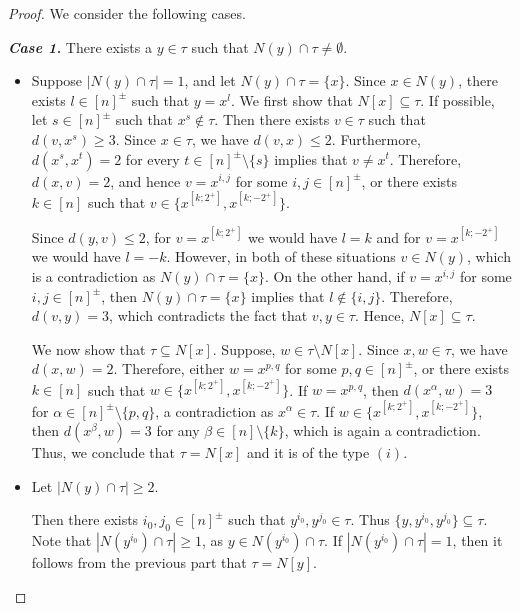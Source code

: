\documentclass{amsart}
\theoremstyle{definition}
\theoremstyle{remark}
\numberwithin{equation}{section}
\begin{document}
\begin{proof}
	We consider the following cases. 
	
	{\it \bf Case 1.} There exists a $y \in \tau$ such that $N(y) \cap \tau \neq  \emptyset$. 
	
	\begin{itemize}
		\item Suppose $|N(y) \cap \tau|=1$, and let $N(y) \cap \tau = \{x\}$. Since $x \in N(y)$, there exists  $l\in [n]^{\pm}$ such that 
		$y = x^{l}$.  We first show that  $N[x] \subseteq \tau$. If possible, let $s \in [n]^{\pm}$ such that $x^{s} \notin \tau$. Then %
        there exists  $v\in\tau$ such that $d(v, x^{s}) \geq 3$. Since $x \in \tau$, we have $d(v, x) \leq 2$. Furthermore, $d(x^{s}, x^{t}) = 2$ for every $t \in [n]^{\pm} \setminus \{s\}$ implies that $v \neq x^t$. Therefore, $d(x, v) = 2$, and hence $v = x^{i, j}$ for some  $i, j \in [n]^{\pm}$, or there exists $k \in [n]$ such that  $v \in \{x^{[k; 2^+]}, x^{[k; -2^+]}\}$.
        
        Since $d(y, v) \leq 2$, for $v=x^{[k; 2^+]}$ we would have $l=k$ and for  $v=x^{[k; -2^+]}$ we would have $l=-k$. However, in both of these situations $v \in N(y)$, which is a contradiction as $N(y) \cap \tau = \{x\}$. On the other hand, if  $v = x^{i, j}$ for some $i, j \in [n]^{\pm}$, then $N(y) \cap \tau = \{x\}$ implies that $l \notin \{i, j\}$. Therefore, $d(v, y) = 3$, which contradicts the fact that $v,y\in\tau$.  Hence,  $N[x]\subseteq \tau$. 
		
		We now show that $\tau \subseteq N[x]$. Suppose, $w\in \tau\setminus N[x]$. Since $x, w \in \tau$, we have $d(x, w) = 2$. Therefore, either $w = x^{p, q}$ for some  $p, q \in [n]^{\pm}$, or there exists $k \in [n]$ such that $w \in \{x^{[k; 2^+]}, x^{[k; -2^+]}\}$.	 
		If  $w = x^{p, q}$, 
		then $d(x^{\alpha}, w) = 3$ for  $\alpha \in [n]^{\pm} \setminus \{p, q\}$, a contradiction as $x^{\alpha} \in \tau$. 
		If $w \in \{x^{[k; 2^+]}, x^{[k; -2^+]}\}$, then $d(x^{\beta}, w) =3$ for any $\beta\in [n]\setminus \{k\}$,  which is again a contradiction. Thus, we conclude that  $\tau = N[x]$ and it is of the type $(i)$.
		
		
		
		\item Let  $|N(y) \cap \tau| \geq 2$.

  Then there exists $i_0, j_0 \in [n]^{\pm}$ such that $y^{i_0}, y^{j_0} \in \tau.$ Thus $\{y, y^{i_0}, y^{j_0}\} \subseteq \tau$. Note that $|N(y^{i_0}) \cap \tau | \geq 1$, as $y\in N(y^{i_0}) \cap \tau$. If $|N(y^{i_0}) \cap \tau | =1 $, then it follows from the previous part that $\tau = N[y]$.  


\end{itemize}
\end{proof}
\end{document}
